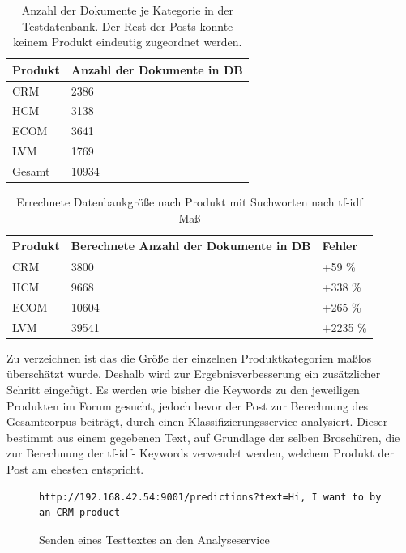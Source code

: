 \begin{table}[h!]
\begin{tabular}{ | p{3cm} | l |}
\hline
Produkt & Anzahl der Dokumente in DB \\ \hline
CRM & 2386 \\ \hline
HCM & 3138 \\ \hline
ECOM & 3641  \\ \hline
LVM & 1769 \\ \hline
Gesamt & 10934 \\ \hline
\end{tabular}
\caption{Anzahl der Dokumente je Kategorie in der Testdatenbank. Der Rest der Posts konnte keinem Produkt eindeutig zugeordnet werden.}
\end{table}

\newpage

\begin{table}[h!]
\begin{tabular}{ | p{3cm} | l | l |}
\hline
Produkt & Berechnete Anzahl der Dokumente in DB & Fehler\\ \hline
CRM & 3800 & +59 \%\\ \hline
HCM & 9668 & +338 \% \\ \hline
ECOM & 10604  & +265 \%\\ \hline
LVM & 39541 & +2235 \%\\ \hline
\end{tabular}
\caption{Errechnete Datenbankgröße nach Produkt mit Suchworten nach tf-idf Maß}
\end{table}

Zu verzeichnen ist das die Größe der einzelnen Produktkategorien maßlos überschätzt wurde. Deshalb wird zur Ergebnisverbesserung ein zusätzlicher Schritt eingefügt. Es werden wie bisher die Keywords zu den jeweiligen Produkten im Forum gesucht, jedoch bevor der Post zur Berechnung des Gesamtcorpus beiträgt, durch einen Klassifizierungsservice \cite{n2o} analysiert. Dieser bestimmt aus einem gegebenen Text, auf Grundlage der selben Broschüren, die zur Berechnung der tf-idf- Keywords verwendet werden, welchem Produkt der Post am ehesten entspricht.

\begin{figure}[h!]
\begin{lstlisting}[language=HTML5]
http://192.168.42.54:9001/predictions?text=Hi, I want to by an CRM product
\end{lstlisting}
\caption{Senden eines Testtextes an den Analyseservice}
\end{figure}

